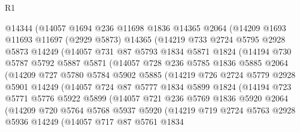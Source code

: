 \begin{lexlean}{R1}
\begin{coremodule}
        @14344
        (@14057
          @1694
          @236
          @11698
          @1836
          @14365
          @2064
          (@14209
            @1693
            @11693
            @11697
            (@2929 @5873)
            @14365
            (@14219
              @733
              @2724
              @5795
              @2928
              @5873
              @14249
              (@14057
                @731
                @87
                @5793
                @1834
                @5871
                @1824
                (@14194
                  @730
                  @5787
                  @5792
                  @5887
                  @5871
                  (@14057
                    @728
                    @236
                    @5785
                    @1836
                    @5885
                    @2064
                    (@14209
                      @727
                      @5780
                      @5784
                      @5902
                      @5885
                      (@14219
                        @726
                        @2724
                        @5779
                        @2928
                        @5901
                        @14249
                        (@14057
                          @724
                          @87
                          @5777
                          @1834
                          @5899
                          @1824
                          (@14194
                            @723
                            @5771
                            @5776
                            @5922
                            @5899
                            (@14057
                              @721
                              @236
                              @5769
                              @1836
                              @5920
                              @2064
                              (@14209
                                @720
                                @5764
                                @5768
                                @5937
                                @5920
                                (@14219
                                  @719
                                  @2724
                                  @5763
                                  @2928
                                  @5936
                                  @14249
                                  (@14057
                                    @717
                                    @87
                                    @5761
                                    @1834

\end{coremodule}
\end{lexlean}
